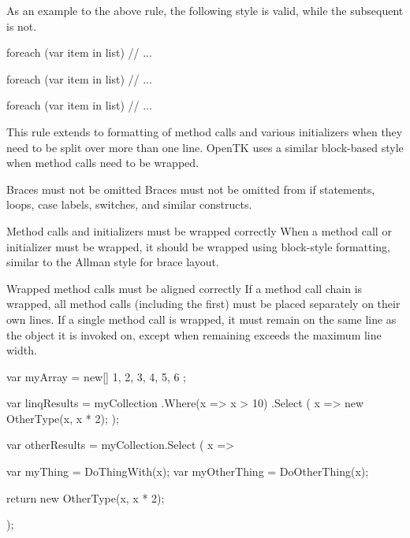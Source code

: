 \documentclass[11pt,a4paper]{article}
\newcounter{rule}[section]
\begin{document}
As an example to the above rule, the following style is valid, while the subsequent is not.

\begin{code}
foreach (var item in list)
{
    // ...
}
\end{code}

\begin{code}
foreach (var item in list) {
    // ...
}

foreach (var item in list) { // ... }
\end{code}

This rule extends to formatting of method calls and various initializers when they need to be split over more than one line. OpenTK uses a similar block-based style when method calls need to be wrapped.

\begin{must}{Braces must not be omitted}
Braces must not be omitted from if statements, loops, case labels, switches, and similar constructs.
\end{must}

\begin{must}{Method calls and initializers must be wrapped correctly}
When a method call or initializer must be wrapped, it should be wrapped using block-style formatting, similar to the Allman style for brace layout.
\end{must}

\begin{must}{Wrapped method calls must be aligned correctly}
If a method call chain is wrapped, all method calls (including the first) must be placed separately on their own lines.
If a single method call is wrapped, it must remain on the same line as the object it is invoked on, except when remaining exceeds the maximum line width.
\end{must}

\begin{code}
var myArray = new[] 
{
    1,
    2,
    3,
    4,
    5,
    6
}; 
\end{code}

\begin{code}
var linqResults = myCollection
    .Where(x => x > 10)
    .Select
    (
        x => 
            new OtherType(x, x * 2);
    );
    
var otherResults = myCollection.Select
    (
        x => 
        {
            var myThing = DoThingWith(x);
            var myOtherThing = DoOtherThing(x);
            
            return new OtherType(x, x * 2);
        }
    );
\end{code}
\end{document}

